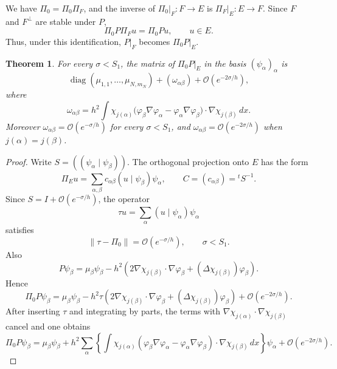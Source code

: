 \documentclass[11pt,a4paper]{article}
\newcommand{\cO}{\mathcal O}
\newcommand{\norm}[1]{\left\lVert #1\right\rVert}
\newcommand{\ip}[2]{\left(#1\mid #2\right)}
\numberwithin{equation}{section}
\newtheorem{theorem}{Theorem}[section]
\theoremstyle{remark}
\begin{document}
We have $\Pi_0=\Pi_0\Pi_F$, and the inverse of $\Pi_0|_F:F\to E$ is $\Pi_F|_E:E\to F$. Since $F$ and $F^\perp$ are stable under $P$,
\begin{equation}
\Pi_0P\Pi_Fu=\Pi_0Pu,\qquad u\in E.
\end{equation}
Thus, under this identification, $P|_F$ becomes $\Pi_0P|_E$.

\begin{theorem}
For every $\sigma<S_1$, the matrix of $\Pi_0P|_E$ in the basis $(\psi_\alpha)_\alpha$ is
\[
\operatorname{diag}(\mu_{1,1},\ldots,\mu_{N,m_N})+(\omega_{\alpha\beta})+
\cO(e^{-2\sigma/h}),
\]
where
\[
\omega_{\alpha\beta}=h^2\int
\chi_{j(\alpha)}\bigl(\varphi_\beta\nabla\varphi_\alpha-
\varphi_\alpha\nabla\varphi_\beta\bigr)\cdot\nabla\chi_{j(\beta)}\,dx.
\]
Moreover $\omega_{\alpha\beta}=\cO(e^{-\sigma/h})$ for every $\sigma<S_1$, and $\omega_{\alpha\beta}=\cO(e^{-2\sigma/h})$ when $j(\alpha)=j(\beta)$.
\end{theorem}
\begin{proof}
Write $S=(\ip{\psi_\alpha}{\psi_\beta})$. The orthogonal projection onto $E$ has the form
\[
\Pi_Eu=\sum_{\alpha,\beta}c_{\alpha\beta}\ip{u}{\psi_\beta}\psi_\alpha,
\qquad C=(c_{\alpha\beta})={}^tS^{-1}.
\]
Since $S=I+\cO(e^{-\sigma/h})$, the operator
\[
\tau u=\sum_\alpha\ip{u}{\psi_\alpha}\psi_\alpha
\]
satisfies
\begin{equation}
\norm{\tau-\Pi_0}=\cO(e^{-\sigma/h}),\qquad\sigma<S_1.
\end{equation}
Also
\[
P\psi_\beta=\mu_\beta\psi_\beta-h^2\left(2\nabla\chi_{j(\beta)}\cdot\nabla\varphi_\beta+
(\Delta\chi_{j(\beta)})\varphi_\beta\right).
\]
Hence
\begin{equation}
\Pi_0P\psi_\beta=\mu_\beta\psi_\beta-h^2\tau\left(2\nabla\chi_{j(\beta)}\cdot\nabla\varphi_\beta+
(\Delta\chi_{j(\beta)})\varphi_\beta\right)+\cO(e^{-2\sigma/h}).
\end{equation}
After inserting $\tau$ and integrating by parts, the terms with $\nabla\chi_{j(\alpha)}\cdot\nabla\chi_{j(\beta)}$ cancel and one obtains
\begin{equation}
\Pi_0P\psi_\beta=\mu_\beta\psi_\beta+
 h^2\sum_\alpha\left\{\int\chi_{j(\alpha)}
(\varphi_\beta\nabla\varphi_\alpha-
\varphi_\alpha\nabla\varphi_\beta)\cdot\nabla\chi_{j(\beta)}\,dx\right\}\psi_\alpha
+\cO(e^{-2\sigma/h}).
\end{equation}
\end{proof}
\end{document}
